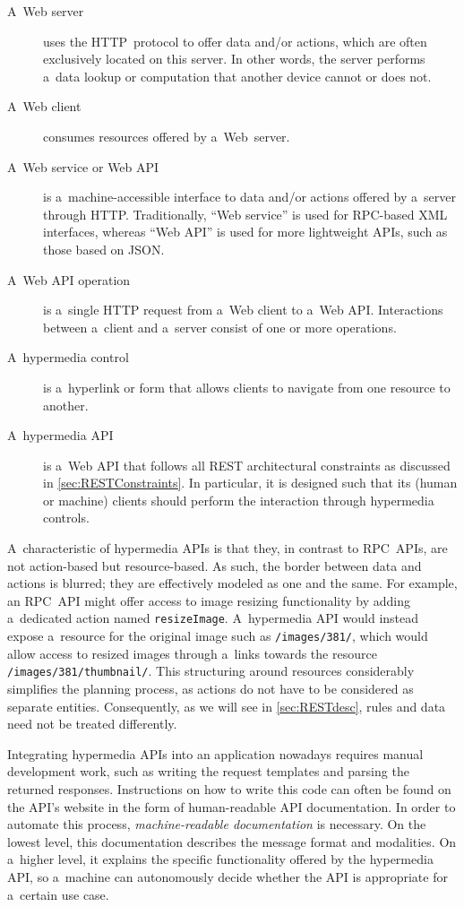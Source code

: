 \begin{description}\label{api}
  \item[A~Web server] uses the HTTP~protocol
    to offer data and/or actions,
    which are often exclusively located on this server.
    In other words, the server performs a~data lookup or computation
    that another device cannot or does not.
  \item[A~Web client] consumes resources offered by a~Web~server.
  \item[A~Web service or Web API] is a~machine-accessible interface
    to data and/or actions offered by a~server through HTTP.
    Traditionally, \enquote{Web service} is used for RPC-based XML interfaces,
    whereas \enquote{Web API} is used for more lightweight APIs,
    such as those based on JSON.
  \item[A~Web API operation]
    is a~single HTTP request from a~Web client to a~Web API.
    Interactions between a~client and a~server consist of one or more operations.
  \item[A~hypermedia control] is a~hyperlink or form
    that allows clients to navigate from one resource to another.
  \item[A~hypermedia API] is a~Web API
    that follows all REST architectural constraints
    as discussed in \cref{sec:RESTConstraints}.
    In particular, it is designed such that its (human or machine) clients
    should perform the interaction through hypermedia controls.
\end{description}

A~characteristic of hypermedia APIs is that they,
in contrast to RPC~APIs,
are not action-based but resource-based.
As such, the border between data and actions is blurred;
they are effectively modeled as one and the same.
For example, an RPC~API might offer access to image resizing functionality
by adding a~dedicated action named \verb!resizeImage!.
A~hypermedia API would instead expose a~resource for the original image
such as \verb!/images/381/!,
which would allow access to resized images
through a~links towards the resource \verb!/images/381/thumbnail/!.
This structuring around resources
considerably simplifies the planning process,
as actions do not have to be considered as separate entities.
Consequently, as we will see in \cref{sec:RESTdesc},
rules and data need not be treated differently.

Integrating hypermedia APIs into an application nowadays requires manual development work,
such as writing the \http request templates
and parsing the returned \http responses.
Instructions on how to write this code can often be found
on the API's website in the form of human-readable API documentation.
In order to automate this process, \emph{machine-readable documentation} is necessary.
On the lowest level, this documentation describes the message format and modalities.
On a~higher level, it explains the specific functionality offered by the hypermedia API,
so a~machine can autonomously decide whether the API is appropriate for a~certain use case.

